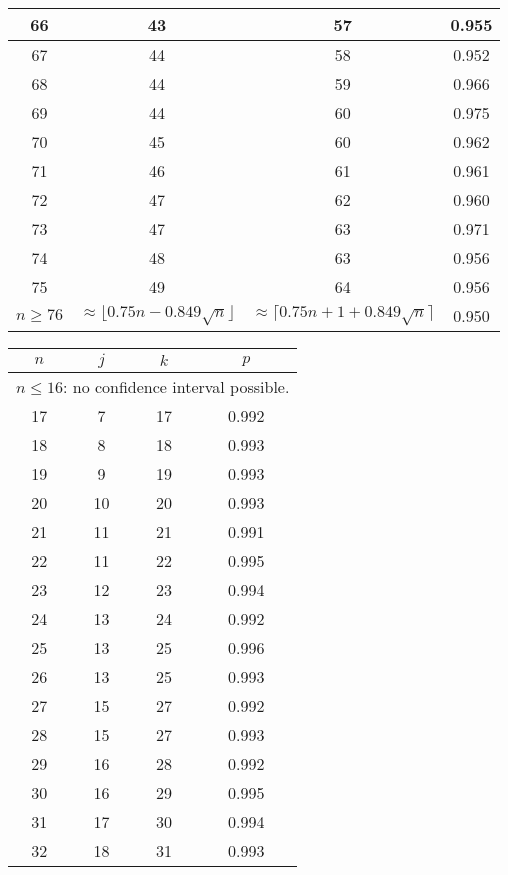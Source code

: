 \begin{table}
\begin{tabular}{|c|c|c|c|}
 66  & 43  & 57 & 0.955  \\ \hline
 67  & 44  & 58 & 0.952  \\ \hline
 68  & 44  & 59 & 0.966  \\ \hline
 69  & 44  & 60 & 0.975  \\ \hline
 70  & 45  & 60 & 0.962  \\ \hline
 71  & 46  & 61 & 0.961  \\ \hline
 72  & 47  & 62 & 0.960  \\ \hline
 73  & 47  & 63 & 0.971  \\ \hline
 74  & 48  & 63 & 0.956  \\ \hline
 75  & 49  & 64 & 0.956  \\ \hline
\hline $n \geq 76$ &
\multicolumn{1}{p{15mm}|}{$\approx \lfloor 0.75 n - 0.849 \sqrt{n}\rfloor$} &
\multicolumn{1}{p{15mm}|}{$\approx \lceil 0.75 n + 1 + 0.849 \sqrt{n}\rceil$} &
0.950 \\ \hline
\end{tabular}
 \hspace{2mm}
\hspace{2mm}
 \begin{tabular}{|c|c|c|c|}
 \hline $n$ & $j$ & $k$ & $p$ \\ \hline \hline
\multicolumn{4}{|c|}{
$n \leq 16 $: no confidence interval possible.}\\ \hline
 17  & 7  & 17 & 0.992  \\ \hline
 18  & 8  & 18 & 0.993  \\ \hline
 19  & 9  & 19 & 0.993  \\ \hline
 20  & 10  & 20 & 0.993  \\ \hline
 21  & 11  & 21 & 0.991  \\ \hline
 22  & 11  & 22 & 0.995  \\ \hline
 23  & 12  & 23 & 0.994  \\ \hline
 24  & 13  & 24 & 0.992  \\ \hline
 25  & 13  & 25 & 0.996  \\ \hline
 26  & 13  & 25 & 0.993  \\ \hline
 27  & 15  & 27 & 0.992  \\ \hline
 28  & 15  & 27 & 0.993  \\ \hline
 29  & 16  & 28 & 0.992  \\ \hline
 30  & 16  & 29 & 0.995  \\ \hline
 31  & 17  & 30 & 0.994  \\ \hline
 32  & 18  & 31 & 0.993  \\ \hline

\end{tabular}
\end{table}
